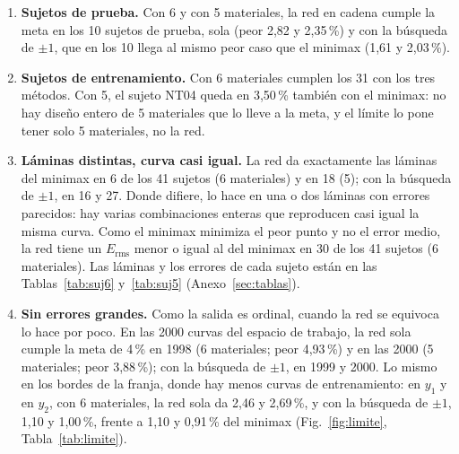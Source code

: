 \begin{enumerate}[label=(\roman*)]
\item \textbf{Sujetos de prueba.} Con 6 y con 5 materiales, la red en cadena cumple la meta en los 10 sujetos de prueba, sola (peor 2,82 y 2,35\,\%) y con la búsqueda de $\pm1$, que en los 10 llega al mismo peor caso que el minimax (1,61 y 2,03\,\%).
\item \textbf{Sujetos de entrenamiento.} Con 6 materiales cumplen los 31 con los tres métodos. Con 5, el sujeto NT04 queda en 3,50\,\% también con el minimax: no hay diseño entero de 5 materiales que lo lleve a la meta, y el límite lo pone tener solo 5 materiales, no la red.
\item \textbf{Láminas distintas, curva casi igual.} La red da exactamente las láminas del minimax en 6 de los 41 sujetos (6 materiales) y en 18 (5); con la búsqueda de $\pm1$, en 16 y 27. Donde difiere, lo hace en una o dos láminas con errores parecidos: hay varias combinaciones enteras que reproducen casi igual la misma curva. Como el minimax minimiza el peor punto y no el error medio, la red tiene un $E_{\mathrm{rms}}$ menor o igual al del minimax en 30 de los 41 sujetos (6 materiales). Las láminas y los errores de cada sujeto están en las Tablas~\ref{tab:suj6} y~\ref{tab:suj5} (Anexo~\ref{sec:tablas}).
\item \textbf{Sin errores grandes.} Como la salida es ordinal, cuando la red se equivoca lo hace por poco. En las 2000 curvas del espacio de trabajo, la red sola cumple la meta de 4\,\% en 1998 (6 materiales; peor 4,93\,\%) y en las 2000 (5 materiales; peor 3,88\,\%); con la búsqueda de $\pm1$, en 1999 y 2000. Lo mismo en los bordes de la franja, donde hay menos curvas de entrenamiento: en $y_1$ y en $y_2$, con 6 materiales, la red sola da 2,46 y 2,69\,\%, y con la búsqueda de $\pm1$, 1,10 y 1,00\,\%, frente a 1,10 y 0,91\,\% del minimax (Fig.~\ref{fig:limite}, Tabla~\ref{tab:limite}).
\end{enumerate}

